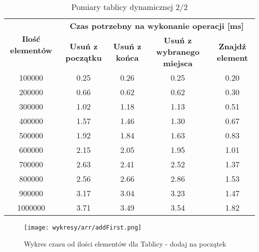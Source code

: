 \documentclass{article}
\begin{document}
    
    \begin{table}[H]
        \centering
        \begin{tabular}{|c|cccc|}
            \hline
            \multirow{2}{*}{\textbf{Ilość   elementów}} & \multicolumn{4}{c|}{\textbf{Czas potrzebny na wykonanie operacji {[}ms{]}}} \\ \cline{2-5} 
             & \multicolumn{1}{c|}{\textbf{Usuń z początku}} & \multicolumn{1}{c|}{\textbf{Usuń z końca}} & \multicolumn{1}{c|}{\textbf{Usuń z wybranego   miejsca}} & \textbf{Znajdź element} \\ \hline
            100000 & \multicolumn{1}{c|}{0.25} & \multicolumn{1}{c|}{0.26} & \multicolumn{1}{c|}{0.25} & 0.20 \\ \hline
            200000 & \multicolumn{1}{c|}{0.66} & \multicolumn{1}{c|}{0.62} & \multicolumn{1}{c|}{0.62} & 0.30 \\ \hline
            300000 & \multicolumn{1}{c|}{1.02} & \multicolumn{1}{c|}{1.18} & \multicolumn{1}{c|}{1.13} & 0.51 \\ \hline
            400000 & \multicolumn{1}{c|}{1.57} & \multicolumn{1}{c|}{1.46} & \multicolumn{1}{c|}{1.30} & 0.67 \\ \hline
            500000 & \multicolumn{1}{c|}{1.92} & \multicolumn{1}{c|}{1.84} & \multicolumn{1}{c|}{1.63} & 0.83 \\ \hline
            600000 & \multicolumn{1}{c|}{2.15} & \multicolumn{1}{c|}{2.05} & \multicolumn{1}{c|}{1.95} & 1.01 \\ \hline
            700000 & \multicolumn{1}{c|}{2.63} & \multicolumn{1}{c|}{2.41} & \multicolumn{1}{c|}{2.52} & 1.37 \\ \hline
            800000 & \multicolumn{1}{c|}{2.56} & \multicolumn{1}{c|}{2.66} & \multicolumn{1}{c|}{2.86} & 1.53 \\ \hline
            900000 & \multicolumn{1}{c|}{3.17} & \multicolumn{1}{c|}{3.04} & \multicolumn{1}{c|}{3.23} & 1.47 \\ \hline
            1000000 & \multicolumn{1}{c|}{3.71} & \multicolumn{1}{c|}{3.49} & \multicolumn{1}{c|}{3.54} & 1.82 \\ \hline
        \end{tabular}
        \caption{Pomiary tablicy dynamicznej 2/2}
    \end{table}


    \begin{figure}[H]
        \centering
        \texttt{[image: wykresy/arr/addFirst.png]}
        \caption{Wykres czasu od ilości elementów dla Tablicy - dodaj na początek}
    \end{figure}
\end{document}
